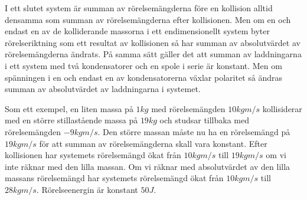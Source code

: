 \documentclass[]{../common/elementary-physics}
\begin{document}
I ett slutet system är summan av rörelsemängderna före en kollision alltid densamma som summan av rörelsemängderna efter kollisionen.
Men om en och endast en av de kolliderande massorna i ett endimensionellt system byter rörelseriktning som ett resultat av kollisionen så har summan av absolutvärdet av rörelsemängderna ändrats.
På samma sätt gäller det att summan av laddningarna i ett  system med två kondensatorer och en spole i serie är konstant.
Men om spänningen i en och endast en av kondensatorerna växlar polaritet så ändras summan av absolutvärdet av laddningarna i systemet.

Som ett exempel, en liten massa på $1 kg$ med rörelsemängden $10 kgm/s$ kollisiderar med en större stillastående massa på $19 kg$ och studsar tillbaka med rörelsemängden $-9 kgm/s$.
Den större massan måste nu ha en rörelsemängd på $19 kgm/s$ för att summan av rörelsemängderna skall vara konstant.
Efter kollisionen har systemets rörelsemängd ökat från $10 kgm/s$ till $19 kgm/s$ om vi inte räknar med den lilla massan.
Om vi räknar med absolutvärdet av den lilla massans rörelsemängd har systemets rörelsemängd ökat från $10 kgm/s$ till $28 kgm/s$.
Rörelseenergin är konstant $50 J$.



\printbibliography
\end{document}
